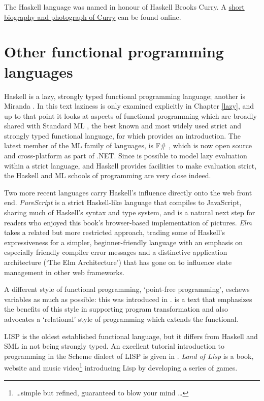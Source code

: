 The Haskell language was named in honour of Haskell Brooks Curry. A
\href{https://mathshistory.st-andrews.ac.uk/Biographies/Curry/}{short biography and photograph of Curry} can be found online.

\section*{Other functional programming languages}

Haskell is a lazy, strongly typed functional programming language; 
another is Miranda \cite{mira,miraCraft}. In
this text laziness is only examined explicitly in Chapter \ref{lazy},
and up to that point it looks at aspects of functional programming which
are broadly shared with Standard ML , the
best known and most widely used strict and strongly typed functional language, for which
 provides an introduction. The latest member of the ML family of languages, is F\# \cite{Fsharp}, which is now open source and cross-platform as part of .NET. Since is possible to model
lazy evaluation within a strict language, and Haskell provides
facilities to make evaluation strict, the Haskell and ML schools of programming are very close
indeed.

Two more recent languages carry Haskell's influence directly onto the web front end. \emph{PureScript} \cite{PureScript} is a strict Haskell-like language that compiles to JavaScript, sharing much of Haskell's syntax and type system, and is a natural next step for readers who enjoyed this book's browser-based implementation of pictures. \emph{Elm} \cite{Elm} takes a related but more restricted approach, trading some of Haskell's expressiveness for a simpler, beginner-friendly language with an emphasis on especially friendly compiler error messages and a distinctive application architecture (`The Elm Architecture') that has gone on to influence state management in other web frameworks.

A different style of functional programming, `point-free programming', eschews variables as much
as possible: this was introduced in .  is a text that
emphasizes the benefits of this style in supporting program
transformation and also advocates a `relational' style of programming
which extends the functional.

LISP is the oldest established functional language, but it differs from
Haskell and SML in not being strongly typed. An excellent tutorial
introduction to programming in the Scheme dialect of LISP is given in 
. \emph{Land of Lisp} \cite{LandOfLisp} is a book, website and music video\footnote{\ldots simple but refined, guaranteed to blow your mind \ldots} introducing Lisp by developing a series of games.

